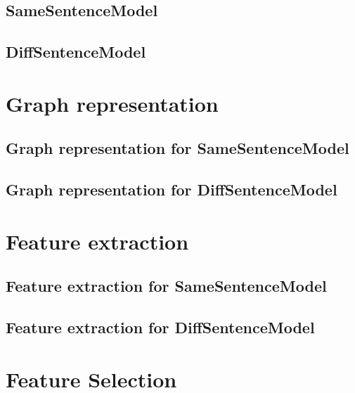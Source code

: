 \subsection{SameSentenceModel}

\subsection{DiffSentenceModel}

\section{Graph representation} \label{sec:graphRep}

\subsection{Graph representation for SameSentenceModel}

\subsection{Graph representation for DiffSentenceModel}

\section{Feature extraction}\label{sec:featExp}

\subsection{Feature extraction for SameSentenceModel}

\subsection{Feature extraction for DiffSentenceModel}

\section{Feature Selection}\label{sec:featSel}

%
%
%

